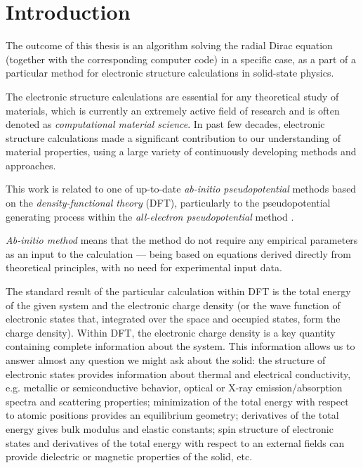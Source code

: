 \def\em{\it}

\chapter{Introduction}

The outcome of this thesis is an algorithm solving the radial Dirac equation
(together with the corresponding computer code) in a specific case, as a part 
of a particular method for electronic structure calculations in solid-state
physics.

The electronic structure calculations are essential for any theoretical study
of materials, which is currently an extremely active field of research 
and is often denoted as {\em computational material science}.
In past few decades, electronic structure calculations made a significant 
contribution to our understanding of material properties,
using a large variety of continuously developing methods and approaches.

This work is related to one of up-to-date {\em ab-initio pseudopotential} 
methods based on the {\em density-functional theory} 
(DFT)\cite{wikidft,pickett},
particularly to the pseudopotential generating process within the 
{\em all-electron pseudopotential} method
\cite{vackarAEPP1,vackarAEPP2}.

{\em Ab-initio method} means that the method do not require any empirical 
parameters as an input to the calculation --- being based on equations 
derived directly from theoretical principles, with no need for 
experimental input data.

The standard result of the particular calculation within DFT is the total 
energy of the given system and the electronic charge density (or the wave 
function of electronic states that, integrated over the space and occupied 
states, form the charge density). Within DFT, the electronic charge density 
is a key quantity containing complete information about the system. 
This information allows us to answer almost any question we might ask about 
the solid: 
the structure of electronic states provides information about thermal and
electrical conductivity, e.g. metallic or semiconductive behavior, 
optical or X-ray emission/absorption spectra and scattering properties;
minimization of the total energy with respect to atomic positions provides 
an equilibrium geometry; derivatives of the total energy gives bulk modulus 
and elastic constants; spin structure of electronic states and derivatives 
of the total energy with respect to an external fields can provide dielectric
or magnetic properties of the solid, etc.

